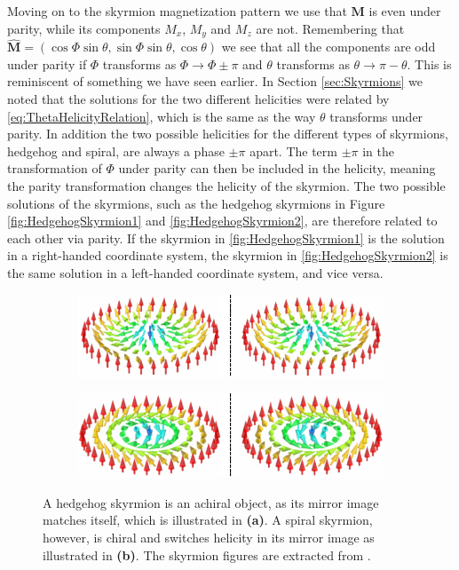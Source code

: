 Moving on to the skyrmion magnetization pattern we use that $\mathbold{M}$ is even under parity, while its components $M_x$, $M_y$ and $M_z$ are not. Remembering that $\mathbold{\hat{M}} = \left(\cos\Phi\sin\theta, \sin\Phi\sin\theta, \cos\theta\right)$ we see that all the components are odd under parity if $\Phi$ transforms as $\Phi \rightarrow \Phi \pm \pi$ and $\theta$ transforms as $\theta\rightarrow\pi-\theta$. This is reminiscent of something we have seen earlier. In Section \ref{sec:Skyrmions} we noted that the solutions for the two different helicities were related by \eqref{eq:ThetaHelicityRelation}, which is the same as the way $\theta$ transforms under parity. In addition the two possible helicities for the different types of skyrmions, hedgehog and spiral, are always a phase $\pm\pi$ apart. The term $\pm\pi$ in the transformation of $\Phi$ under parity can then be included in the helicity, meaning the parity transformation changes the helicity of the skyrmion. The two possible solutions of the skyrmions, such as the hedgehog skyrmions in Figure \ref{fig:HedgehogSkyrmion1} and \ref{fig:HedgehogSkyrmion2}, are therefore related to each other via parity. If the skyrmion in \ref{fig:HedgehogSkyrmion1} is the solution in a right-handed coordinate system, the skyrmion in \ref{fig:HedgehogSkyrmion2} is the same solution in a left-handed coordinate system, and vice versa.
\begin{figure}[h!]
\centering
\begin{subfigure}{.95\textwidth}
  \centering
  \includegraphics[width=\linewidth]{Figures/MirroredSkyrmion.pdf}
  \caption{}
  \label{fig:MirrorHedgehog}
\end{subfigure}

\begin{subfigure}{.95\textwidth}
  \centering
  \includegraphics[width=\linewidth]{Figures/MirroredSpiralSkyrmion.pdf}
  \caption{}
  \label{fig:MirrorSpiral}
\end{subfigure}
\caption{A hedgehog skyrmion is an achiral object, as its mirror image matches itself, which is illustrated in \textbf{(a)}. A spiral skyrmion, however, is chiral and switches helicity in its mirror image as illustrated in \textbf{(b)}. The skyrmion figures are extracted from \cite{EverschorDissertation}.}
\label{fig:ChiralitySkyrmions}
\end{figure}

